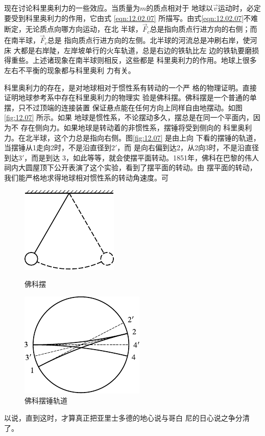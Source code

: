 现在讨论科里奥利力的一些效应。当质量为$ m $的质点相对于
地球以$\vec{v}$运动时，必定要受到科里奥利力的作用，它由式 \eqref{eqn:12.02.07}
所描写。由式\eqref{eqn:12.02.07}不难断定，无论质点向哪方向运动，在北
半球，$ \vec{F}_c $总是指向质点行进方向的右侧；而在南半球，$ \vec{F}_c $总是
指向质点行进方向的左侧。北半球的河流总是冲刷右岸，使河床
大都是右岸陡，左岸坡单行的火车轨道，总是右边的铁轨比左
边的铁轨要磨损得重些。上述诸现象在南半球则相反，这些都是
科里奥利力的作用。地球上很多左右不平衡的现象都与科里奥利
力有关。

科里奥利力的存在，是对地球相对于惯性系有转动的一个严
格的物理证明。直接证明地球参考系中存在科里奥利力的物理实
验是佛科摆。佛科摆是一个普通的单摆，只不过顶端的连接装置
保证悬点能在任何方向上同样自由地摆动。如图\ref{fig:12.07} 所示。如果
地球是惯性系，不论摆动多久，摆总是在同一个平面内，因为不
存在侧向力。如果地球是转动着的非惯性系，摆锤将受到侧向的
科里奥利力。在北半球，这个力总是指向右侧。图\ref{fig:12.07} 是由上向
下看的摆锤的轨道，当摆锤从1走向2时，不是沿直径到$ 2' $，而
是向右偏到达2，从2向3时，不是沿直径到达$ 3' $，而是到达
3，如此等等，就会使摆平面转动。1851年，佛科在巴黎的伟人
祠内大圆屋顶下公开表演了这个实验，看到了摆平面的转动。由
摆平面的转动，我们能严格地求得地球相对惯性系的转动角速度。可

\begin{figure}[h]
    \begin{minipage}[b]{0.5\linewidth}
        \centering
        \includegraphics{figure/fig12.07}
        \caption{佛科摆}
        \label{fig:12.07}
    \end{minipage}
    \begin{minipage}[b]{0.5\linewidth}
        \centering
        \includegraphics{figure/fig12.08}
        \caption{佛科摆锤轨道}
        \label{fig:12.08}
    \end{minipage}
\end{figure}%
\noindent
以说，直到这时，才算真正把亚里士多德的地心说与哥白
尼的日心说之争分清了。

